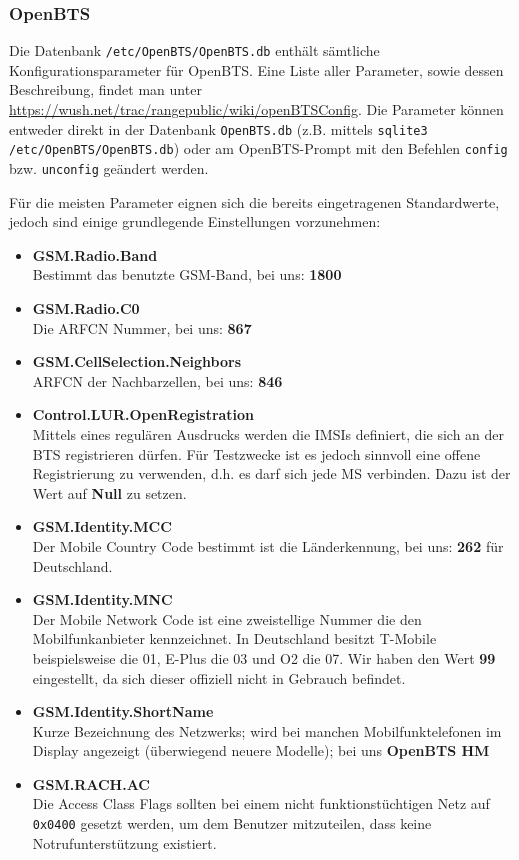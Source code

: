 \subsubsection{OpenBTS}
Die Datenbank \verb|/etc/OpenBTS/OpenBTS.db| enthält sämtliche Konfigurationsparameter für OpenBTS. Eine Liste aller Parameter, sowie dessen Beschreibung, findet man unter \url{https://wush.net/trac/rangepublic/wiki/openBTSConfig}.
Die Parameter können entweder direkt in der Datenbank \verb|OpenBTS.db| (z.B. mittels \verb|sqlite3 /etc/OpenBTS/OpenBTS.db|) oder am OpenBTS-Prompt mit den Befehlen \verb|config| bzw. \verb|unconfig| geändert werden.

Für die meisten Parameter eignen sich die bereits eingetragenen Standardwerte, jedoch sind einige grundlegende Einstellungen vorzunehmen:

\begin{itemize}
  \item \textbf{GSM.Radio.Band}\\
  Bestimmt das benutzte GSM-Band, bei uns: \textbf{1800}
  \item \textbf{GSM.Radio.C0}\\
  Die ARFCN Nummer, bei uns: \textbf{867}
  \item \textbf{GSM.CellSelection.Neighbors}\\
  ARFCN der Nachbarzellen, bei uns: \textbf{846}
  \item \textbf{Control.LUR.OpenRegistration}\\
  Mittels eines regulären Ausdrucks werden die IMSIs definiert, die sich an der BTS registrieren dürfen. Für Testzwecke ist es jedoch sinnvoll eine offene Registrierung zu verwenden, d.h. es darf sich jede MS verbinden. Dazu ist der Wert auf \textbf{Null} zu setzen.
  \item \textbf{GSM.Identity.MCC}\\
  Der Mobile Country Code bestimmt ist die Länderkennung, bei uns: \textbf{262} für Deutschland.
  \item \textbf{GSM.Identity.MNC}\\
  Der Mobile Network Code ist eine zweistellige Nummer die den Mobilfunkanbieter kennzeichnet. In Deutschland besitzt T-Mobile beispielsweise die 01, E-Plus die 03 und O2 die 07. Wir haben den Wert \textbf{99} eingestellt, da sich dieser offiziell nicht in Gebrauch befindet.
  \item \textbf{GSM.Identity.ShortName}\\
  Kurze Bezeichnung des Netzwerks; wird bei manchen Mobilfunktelefonen im Display angezeigt (überwiegend neuere Modelle); bei uns \textbf{OpenBTS HM}
  \item \textbf{GSM.RACH.AC}\\
  Die Access Class Flags sollten bei einem nicht funktionstüchtigen Netz auf \verb|0x0400| gesetzt werden, um dem Benutzer mitzuteilen, dass keine Notrufunterstützung existiert.    
\end{itemize} 

